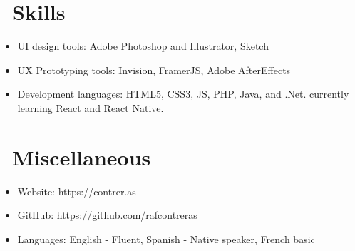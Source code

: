 \documentclass{resume}
\begin{document}
\section{\faCogs\ Skills}
\begin{itemize}[parsep=0.5ex]
  \item UI design tools: Adobe Photoshop and Illustrator, Sketch
  \item UX Prototyping tools: Invision, FramerJS, Adobe AfterEffects
  \item Development languages: HTML5, CSS3, JS, PHP, Java, and .Net. currently learning React and React Native.
\end{itemize}

\section{\faInfo\ Miscellaneous}
\begin{itemize}[parsep=0.5ex]
  \item Website: https://contrer.as
  \item GitHub: https://github.com/rafcontreras
  \item Languages: English - Fluent, Spanish - Native speaker, French basic
\end{itemize}

%
%
\end{document}
